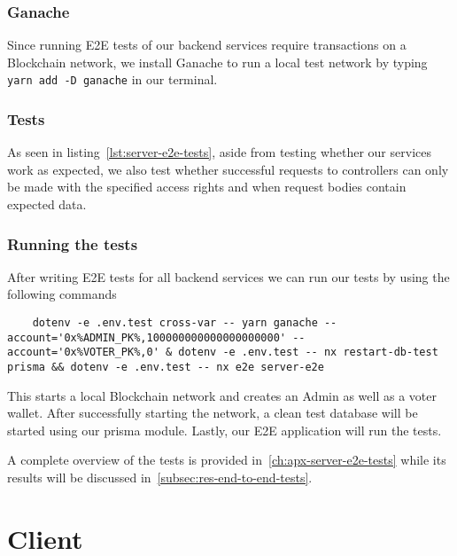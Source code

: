 \subsubsection{Ganache}

Since running \gls{E2E} tests of our backend services require transactions on a \gls{Blockchain} network, we install Ganache to run a local test network by typing \texttt{yarn add -D ganache} in our terminal.

\subsubsection{Tests}


As seen in listing~\ref{lst:server-e2e-tests}, aside from testing whether our services work as expected, we also test whether successful requests to controllers can only be made with the specified access rights and when request bodies contain expected data.

\subsubsection{Running the tests}

After writing \gls{E2E} tests for all backend services we can run our tests by using the following commands


\begin{verbatim}
    dotenv -e .env.test cross-var -- yarn ganache --account='0x%ADMIN_PK%,100000000000000000000' --account='0x%VOTER_PK%,0' & dotenv -e .env.test -- nx restart-db-test prisma && dotenv -e .env.test -- nx e2e server-e2e
\end{verbatim}

This starts a local \gls{Blockchain} network and creates an \gls{Admin} as well as a voter wallet.
After successfully starting the network, a clean test database will be started using our prisma module.
Lastly, our \gls{E2E} application will run the tests.

A complete overview of the tests is provided in~\cref{ch:apx-server-e2e-tests} while its results will be discussed in~\cref{subsec:res-end-to-end-tests}.

\section{Client}\label{sec:client}

